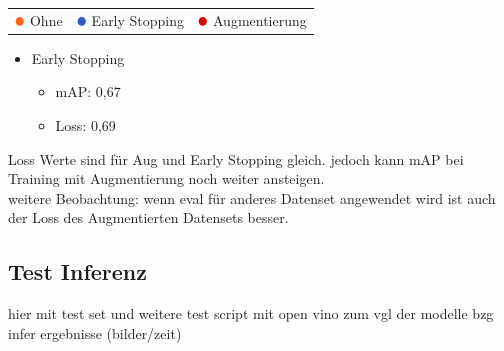 \begin{figure}[htb]
\begin{minipage}{0.5\textwidth}
  \centering
  \label{plot:mAP}
  \def\svgwidth{0.9\textwidth}
  
\end{minipage}
\begin{minipage}{0.5\textwidth}
  \centering
  \label{plot:Loss}
  \def\svgwidth{0.9\textwidth}
  
\end{minipage}
\end{figure}


\begin{table}[htb]
  \centering
  \begin{tabular}{m{}<{\centering}m{}<{\centering}m{}<{\centering}}
    $\color[RGB]{255,100,30}\medbullet$  Ohne & $\color[RGB]{50,90,200}\medbullet$  Early Stopping & $\color[RGB]{220,10,0}\medbullet$  Augmentierung
  \end{tabular}    
\end{table}


\begin{itemize}
  \item Early Stopping
  \begin{itemize}
    \item mAP: 0,67
    \item Loss: 0,69
  \end{itemize}
\end{itemize}

Loss Werte sind für Aug und Early Stopping gleich. jedoch kann 
mAP bei Training mit Augmentierung noch weiter ansteigen.
\\
weitere Beobachtung: wenn eval für anderes Datenset 
angewendet wird ist auch der Loss des Augmentierten 
Datensets besser.



\subsection{Test Inferenz}\label{sec:test_inferenz}
hier mit test set und weitere
test script mit open vino zum vgl der modelle bzg infer ergebnisse (bilder/zeit)
